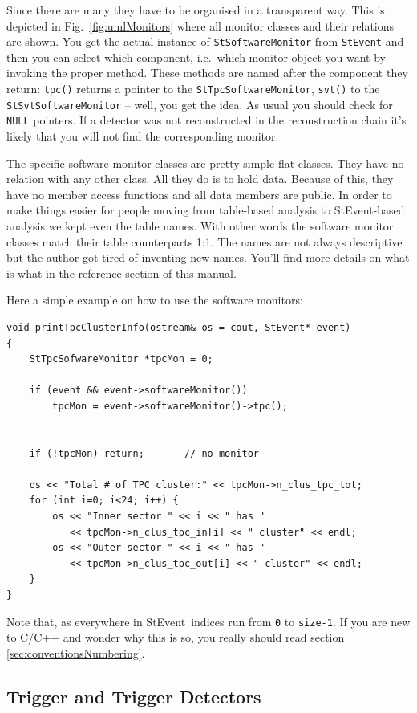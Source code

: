 \documentclass[twoside]{article}
\newcommand{\StEvent}{\textsf{StEvent}}
\begin{document}
Since there are many they have to be organised in a transparent way.
This is depicted in Fig.~\ref{fig:umlMonitors} where all monitor
classes and their relations are shown.  You get the actual instance of
\texttt{StSoftwareMonitor} from \texttt{StEvent} and then you can
select which component, i.e.~which monitor object you want by invoking
the proper method. These methods are named after the component they
return: \texttt{tpc()} returns a pointer to the
\texttt{StTpcSoftwareMonitor}, \texttt{svt()} to the
\texttt{StSvtSoftwareMonitor} -- well, you get the idea. As usual you
should check for \texttt{NULL} pointers. If a detector was not
reconstructed in the reconstruction chain it's likely that you will
not find the corresponding monitor.

The specific software monitor classes are pretty simple flat classes.
They have no relation with any other class. All they do is to hold
data. Because of this, they have no member access functions and all
data members are public. In order to make things easier for people
moving from table-based analysis to \StEvent-based analysis we kept
even the table names.  With other words the software monitor classes
match their table counterparts 1:1.  The names are not always
descriptive but the author got tired of inventing new names.  You'll
find more details on what is what in the reference section of this
manual.

Here a simple example on how to use the software monitors:
\begin{verbatim}
void printTpcClusterInfo(ostream& os = cout, StEvent* event)
{
    StTpcSofwareMonitor *tpcMon = 0;

    if (event && event->softwareMonitor())
        tpcMon = event->softwareMonitor()->tpc();


    if (!tpcMon) return;       // no monitor

    os << "Total # of TPC cluster:" << tpcMon->n_clus_tpc_tot;
    for (int i=0; i<24; i++) {
        os << "Inner sector " << i << " has "
           << tpcMon->n_clus_tpc_in[i] << " cluster" << endl;
        os << "Outer sector " << i << " has "
           << tpcMon->n_clus_tpc_out[i] << " cluster" << endl;
    }
}
\end{verbatim}
Note that, as everywhere in \StEvent\ indices run from \texttt{0} to
\texttt{size-1}.  If you are new to C/C++ and wonder why this is so,
you really should read section \ref{sec:conventionsNumbering}.\vfill

\subsection{Trigger and Trigger Detectors}
 
\end{document}
